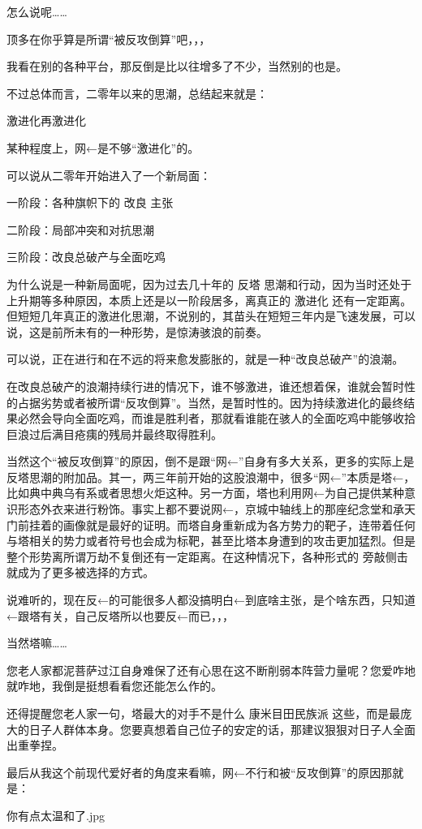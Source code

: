 \begin{zhihuanswer}
怎么说呢\ldots\ldots{}

顶多在你乎算是所谓``被反攻倒算''吧，，，

我看在别的各种平台，那反倒是比以往增多了不少，当然别的也是。

不过总体而言，二零年以来的思潮，总结起来就是：

激进化再激进化

某种程度上，网←是不够``激进化''的。

可以说从二零年开始进入了一个新局面：

一阶段：各种旗帜下的 改良 主张

二阶段：局部冲突和对抗思潮

三阶段：改良总破产与全面吃鸡

为什么说是一种新局面呢，因为过去几十年的 反塔
思潮和行动，因为当时还处于上升期等多种原因，本质上还是以一阶段居多，离真正的
激进化
还有一定距离。但短短几年真正的激进化思潮，不说别的，其苗头在短短三年内是飞速发展，可以说，这是前所未有的一种形势，是惊涛骇浪的前奏。

可以说，正在进行和在不远的将来愈发膨胀的，就是一种``改良总破产''的浪潮。

在改良总破产的浪潮持续行进的情况下，谁不够激进，谁还想着保，谁就会暂时性的占据劣势或者被所谓``反攻倒算''。当然，是暂时性的。因为持续激进化的最终结果必然会导向全面吃鸡，而谁是胜利者，那就看谁能在骇人的全面吃鸡中能够收拾巨浪过后满目疮痍的残局并最终取得胜利。

当然这个``被反攻倒算''的原因，倒不是跟``网←''自身有多大关系，更多的实际上是反塔思潮的附加品。其一，两三年前开始的这股浪潮中，很多``网←''本质是塔←，比如典中典乌有系或者思想火炬这种。另一方面，塔也利用网←为自己提供某种意识形态外衣来进行粉饰。事实上都不要说网←，京城中轴线上的那座纪念堂和承天门前挂着的画像就是最好的证明。而塔自身重新成为各方势力的靶子，连带着任何与塔相关的势力或者符号也会成为标靶，甚至比塔本身遭到的攻击更加猛烈。但是整个形势离所谓万劫不复倒还有一定距离。在这种情况下，各种形式的
旁敲侧击 就成为了更多被选择的方式。

说难听的，现在反←的可能很多人都没搞明白←到底啥主张，是个啥东西，只知道←跟塔有关，自己反塔所以也要反←而已，，，

当然塔嘛\ldots\ldots{}

您老人家都泥菩萨过江自身难保了还有心思在这不断削弱本阵营力量呢？您爱咋地就咋地，我倒是挺想看看您还能怎么作的。

还得提醒您老人家一句，塔最大的对手不是什么 康米目田民族派
这些，而是最庞大的日子人群体本身。您要真想着自己位子的安定的话，那建议狠狠对日子人全面出重拳捏。

最后从我这个前现代爱好者的角度来看嘛，网←不行和被``反攻倒算''的原因那就是：

你有点太温和了.jpg
\end{zhihuanswer}
